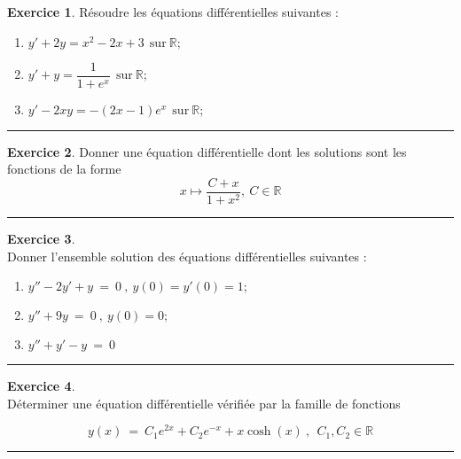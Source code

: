 \documentclass[10pt,a4paper]{article}
\newcommand{\R}{\mathbb{R}}
\theoremstyle{definition}
\theoremstyle{definition}
\newtheorem{exo}{Exercice}
\begin{document}
\begin{center}
\begin{minipage}[t]{0.47\linewidth}
\raggedright

\begin{exo}
Résoudre les équations différentielles suivantes :
\begin{enumerate}
\item $y' + 2y = x^2 -2x +3  \ \  \text{sur} \ \R;$
\item$y' + y =  \dfrac{1}{1+e^x}  \ \  \text{sur} \ \R; $
\item$y' - 2xy  =  -(2x-1)e^x \  \ \text{sur} \  \R; $


\end{enumerate}
\end{exo} 
\begin{center}
\rule{1\linewidth}{0.6pt}
\end{center}

\begin{exo}
Donner une équation différentielle dont les solutions sont les fonctions de la forme 
$$x\longmapsto \dfrac{C + x}{1+ x^2}, \  C \in\R$$
\end{exo}
\begin{center}
\rule{1\linewidth}{0.6pt}
\end{center} 

\end{minipage}	
\hfill\vrule\hfill
\begin{minipage}[t]{0.47\linewidth}
\raggedright

\begin{exo}\quad\\
Donner l'ensemble solution des équations différentielles suivantes :
\begin{enumerate}
\item$y'' -2y'+y \ = \ 0 \ , \  y(0)= y'(0) = 1; $
\item$y'' +9y \ = \ 0 \ , \  y(0)= 0; $
\item $y'' +  y'  - y\ = \ 0 $
\end{enumerate}
\end{exo}
\begin{center}
\rule{1\linewidth}{0.6pt}
\end{center}

\begin{exo}\quad\\
Déterminer une équation différentielle vérifiée par la famille de fonctions

$$y(x) \ = \ C_1e^{2x} + C_2e^{-x} + x\cosh(x) ~,~~ C_1,C_2\in\R$$
\end{exo}
\begin{center}
\rule{1\linewidth}{0.6pt}
\end{center}

 
	\end{minipage}
\end{center}
\quad\\
\end{document}
